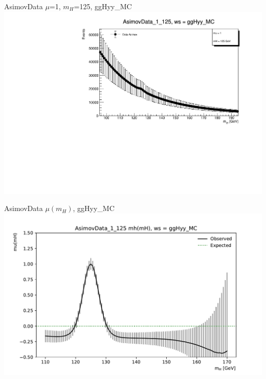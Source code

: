 \documentclass[10pt,UKenglish, leqno, xcolor = dvipsnames]{beamer}
\begin{document}
		\begin{frame}{AsimovData $\mu$=1, $m_H$=125, ggHyy\_MC}
			\vfill
			\includegraphics[width=1.\textwidth]{../images/AsimovData_1_125_ggHyy_MC.pdf}
			\vfill
		\end{frame}
		
		\begin{frame}{AsimovData $\mu(m_H)$, ggHyy\_MC}
			\vfill
			\includegraphics[width=1.\textwidth]{../images/mu_AsimovData_1_125_ggHyy_MC_plot.pdf}
			\vfill
		\end{frame}
		
\end{document}
